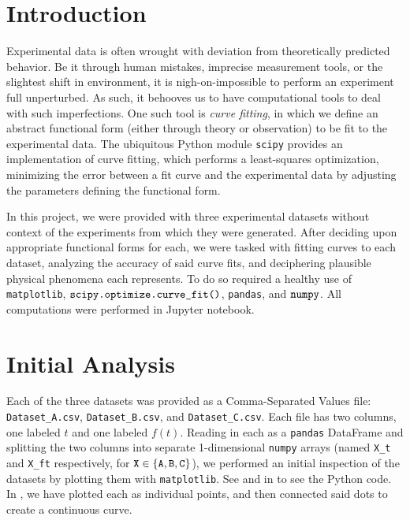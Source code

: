 \documentclass{article}
\begin{document}

\pagestyle{firststyle}


\section{Introduction}

Experimental data is often wrought with deviation from theoretically predicted behavior. Be it through
human mistakes, imprecise measurement tools, or the slightest shift in environment, it is nigh-on-impossible
to perform an experiment full unperturbed. As such, it behooves us to have computational tools to deal with
such imperfections. One such tool is \emph{curve fitting}, in which we define an abstract functional form
(either through theory or observation) to be fit to the experimental data. The ubiquitous Python module
\verb|scipy| provides an implementation of curve fitting, which performs a least-squares optimization,
minimizing the error between a fit curve and the experimental data by adjusting the parameters defining
the functional form.

In this project, we were provided with three experimental datasets without context of the experiments
from which they were generated. After deciding upon appropriate functional forms for each, we
were tasked with fitting curves to each dataset, analyzing the accuracy of said curve fits, and
deciphering plausible physical phenomena each represents. To do so required a healthy use of
\verb|matplotlib|, $\verb|scipy.optimize.curve_fit()|$, \verb|pandas|, and $\verb|numpy|$. 
All computations were performed in Jupyter notebook.

\section{Initial Analysis}

Each of the three datasets was provided as a Comma-Separated Values file: \verb|Dataset_A.csv|, 
\verb|Dataset_B.csv|, and \verb|Dataset_C.csv|. Each file has two columns, one labeled $t$ and one
labeled $f(t)$. Reading in each as a \verb|pandas| DataFrame and splitting the two columns
into separate 1-dimensional \verb|numpy| arrays (named \verb|X_t| and \verb|X_ft| respectively, 
for $\verb|X| \in \{\verb|A|,\verb|B|,\verb|C|\}$), we performed an initial inspection of the datasets
by plotting them with \verb|matplotlib|. See  and  in 
to see the Python code. In , we have plotted each as individual 
points, and then connected said dots to create a continuous curve.
\end{document}
